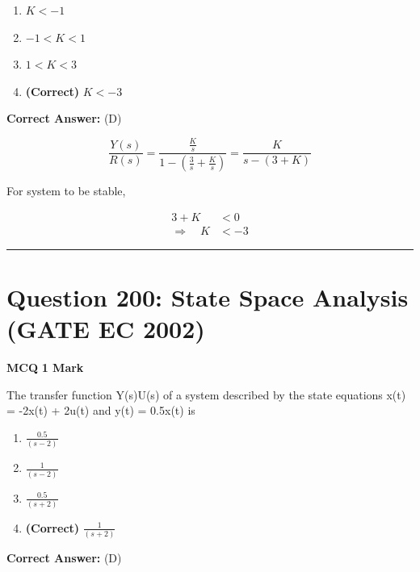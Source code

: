 \documentclass[11pt,a4paper]{article}
\begin{document}
\begin{enumerate}[label=(\Alph*)]
    \item $K < -1$
    \item $- 1< K < 1$
    \item $1< K < 3$
    \item \textbf{(Correct)} $K < -3$
\end{enumerate}

\noindent \textbf{Correct Answer:} (D)

\begin{tcolorbox}[solbox, title=Detailed Solution -- Question 199]
\[
\frac{Y(s)}{R(s)}=\frac{\frac{K}{s}}{1-\left(\frac{3}{s}+\frac{K}{s}\right)}=\frac{K}{s-(3+K)}
\]

 For system to be stable,

\[
\begin{aligned} 3+K& < 0 \\ \Rightarrow \quad K& < -3 \end{aligned}
\]
\end{tcolorbox}

\vspace{1.5em}
\hrule
\vspace{1.5em}

\section*{Question 200: State Space Analysis (GATE EC 2002)}
\noindent \textbf{\color{primary}MCQ} \hfill \textbf{\color{secondary}1 Mark}


\noindent The transfer function Y(s)U(s) of a system described by the state equations
x(t) = -2x(t) + 2u(t) and y(t) = 0.5x(t) is


\begin{enumerate}[label=(\Alph*)]
    \item $\frac{0.5}{(s-2)}$
    \item $\frac{1}{(s-2)}$
    \item $\frac{0.5}{(s+2)}$
    \item \textbf{(Correct)} $\frac{1}{(s+2)}$
\end{enumerate}

\noindent \textbf{Correct Answer:} (D)
\end{document}
